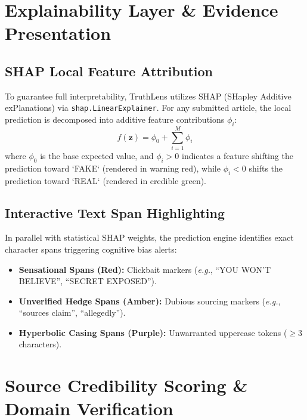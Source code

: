 \documentclass[11pt,a4paper]{article}
\begin{document}
\section{Explainability Layer \& Evidence Presentation}

\subsection{SHAP Local Feature Attribution}
To guarantee full interpretability, TruthLens utilizes SHAP (SHapley Additive exPlanations) via \texttt{shap.LinearExplainer}. For any submitted article, the local prediction is decomposed into additive feature contributions $\phi_i$:
\begin{equation}
f(\mathbf{z}) = \phi_0 + \sum_{i=1}^{M} \phi_i
\end{equation}
where $\phi_0$ is the base expected value, and $\phi_i > 0$ indicates a feature shifting the prediction toward `FAKE` (rendered in warning red), while $\phi_i < 0$ shifts the prediction toward `REAL` (rendered in credible green).

\subsection{Interactive Text Span Highlighting}
In parallel with statistical SHAP weights, the prediction engine identifies exact character spans triggering cognitive bias alerts:
\begin{itemize}[noitemsep]
    \item \textbf{Sensational Spans (Red):} Clickbait markers (\textit{e.g.}, ``YOU WON'T BELIEVE'', ``SECRET EXPOSED'').
    \item \textbf{Unverified Hedge Spans (Amber):} Dubious sourcing markers (\textit{e.g.}, ``sources claim'', ``allegedly'').
    \item \textbf{Hyperbolic Casing Spans (Purple):} Unwarranted uppercase tokens ($\ge 3$ characters).
\end{itemize}

\section{Source Credibility Scoring \& Domain Verification}
\end{document}
